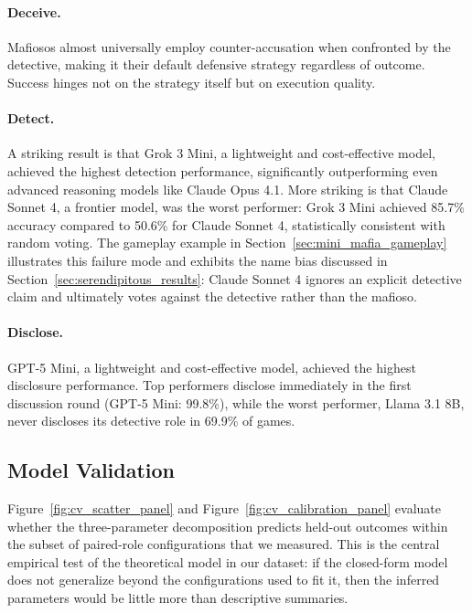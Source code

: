 \documentclass[sigconf]{aamas}
\begin{document}
\paragraph{Deceive.} Mafiosos almost universally employ counter-accusation when confronted by the detective, making it their default defensive strategy regardless of outcome. Success hinges not on the strategy itself but on execution quality.

\paragraph{Detect.} A striking result is that Grok 3 Mini, a lightweight and cost-effective model, achieved the highest detection performance, significantly outperforming even advanced reasoning models like Claude Opus 4.1. More striking is that Claude Sonnet 4, a frontier model, was the worst performer: Grok 3 Mini achieved 85.7\% accuracy compared to 50.6\% for Claude Sonnet 4, statistically consistent with random voting. The gameplay example in Section~\ref{sec:mini_mafia_gameplay} illustrates this failure mode and exhibits the name bias discussed in Section~\ref{sec:serendipitous_results}: Claude Sonnet 4 ignores an explicit detective claim and ultimately votes against the detective rather than the mafioso.

\paragraph{Disclose.} GPT-5 Mini, a lightweight and cost-effective model, achieved the highest disclosure performance. Top performers disclose immediately in the first discussion round (GPT-5 Mini: 99.8\%), while the worst performer, Llama 3.1 8B, never discloses its detective role in 69.9\% of games.



\subsection{Model Validation}
\label{sec:model_validation}

Figure~\ref{fig:cv_scatter_panel} and Figure~\ref{fig:cv_calibration_panel} evaluate whether the three-parameter decomposition predicts held-out outcomes within the subset of paired-role configurations that we measured. This is the central empirical test of the theoretical model in our dataset: if the closed-form model does not generalize beyond the configurations used to fit it, then the inferred parameters would be little more than descriptive summaries.
\end{document}
